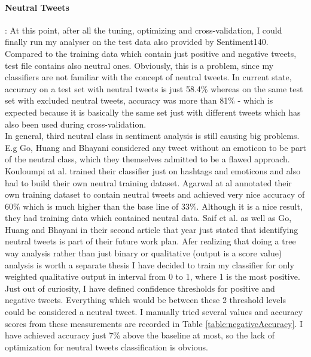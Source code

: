 \paragraph{Neutral Tweets}: At this point, after all the tuning, optimizing and cross-validation, I could finally run my analyser on the test data also provided by Sentiment140. Compared to the training data which contain just positive and negative tweets, test file contains also neutral ones. Obviously, this is a problem, since my classifiers are not familiar with the concept of neutral tweets. In current state, accuracy on a test set with neutral tweets is just 58.4\% whereas on the same test set with excluded neutral tweets, accuracy was more than 81\% - which is expected because it is basically the same set just with different tweets which has also been used	 during cross-validation. \\
In general, third neutral class in sentiment analysis is still causing big problems. E.g Go, Huang and Bhayani \cite{go2009twitter2} considered any tweet without an emoticon to be part of the neutral class, which they themselves admitted to be a flawed approach. Kouloumpi at al. \cite{kouloumpis2011twitter} trained their classifier just on hashtags and emoticons and also had to build their own neutral training dataset.  Agarwal at al \cite{agarwal2011sentiment} annotated their own training dataset to contain neutral tweets and achieved very nice accuracy of 60\% which is much higher than the base line of 33\%. Although it is a nice result, they had training data which contained neutral data. Saif et al. \cite{saif2012semantic} as well as Go, Huang and Bhayani \cite{go2009twitter} in their second article that year just stated that identifying neutral tweets is part of their future work plan.  Afer realizing that doing a tree way analysis rather than just binary or qualitative (output is a score value) analysis is worth a separate thesis I have decided to train my classifier for only weighted qualitative output in interval from 0 to 1, where 1 is the most positive. Just out of curiosity, I have     defined confidence thresholds for positive and negative tweets. Everything which would be between these 2 threshold levels could be considered a neutral tweet. I manually tried several values and accuracy scores from these measurements are recorded in Table \ref{table:negativeAccuracy}. I have achieved accuracy just 7\% above the baseline at most, so the lack of optimization for neutral tweets classification is obvious.\\
\\
